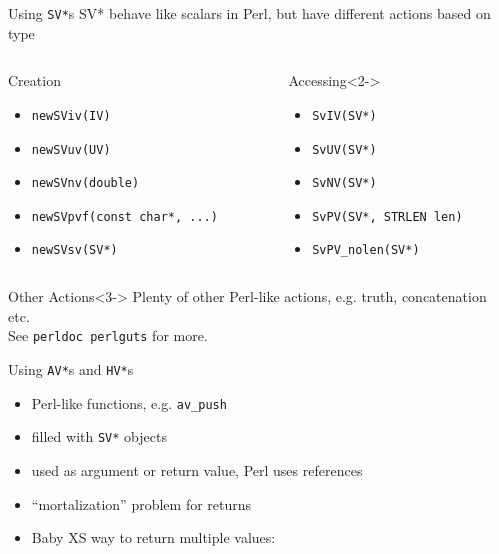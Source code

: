 \documentclass{beamer}
\providecommand{\code}[1]{{\texttt{\scriptsize{#1}}}}
\begin{document}
\begin{frame}{Using \texttt{SV*}s}
  SV* behave like scalars in Perl, but have different actions based on type
  \begin{columns}
    \begin{column}{0.54\linewidth}
      \begin{block}{Creation}
        \begin{itemize}
          \item \code{newSViv(IV)}
          \item \code{newSVuv(UV)}
          \item \code{newSVnv(double)}
          \item \code{newSVpvf(const char*, ...)}
          \item \code{newSVsv(SV*)}
        \end{itemize}
      \end{block}
    \end{column}
    \begin{column}{0.44\linewidth}
      \begin{block}{Accessing}<2->
        \begin{itemize}
          \item \code{SvIV(SV*)}
          \item \code{SvUV(SV*)}
          \item \code{SvNV(SV*)}
          \item \code{SvPV(SV*, STRLEN len)}
          \item \code{SvPV\_nolen(SV*)}
        \end{itemize}
      \end{block}
    \end{column}
  \end{columns}
  \begin{block}{Other Actions}<3->
    Plenty of other Perl-like actions, e.g. truth, concatenation etc.\\See \code{perldoc perlguts} for more.
  \end{block}
\end{frame}

\begin{frame}[fragile]{Using \texttt{AV*}s and \texttt{HV*}s}
  \begin{itemize}
    \item Perl-like functions, e.g. \code{av\_push}
    \item filled with \code{SV*} objects
    \item used as argument or return value, Perl uses references
    \item ``mortalization'' problem for returns
    \item Baby XS way to return multiple values:
  \end{itemize}
  \vfill
  \begin{block}{}
    \scriptsize
    
  \end{block}
\end{frame}
\end{document}
